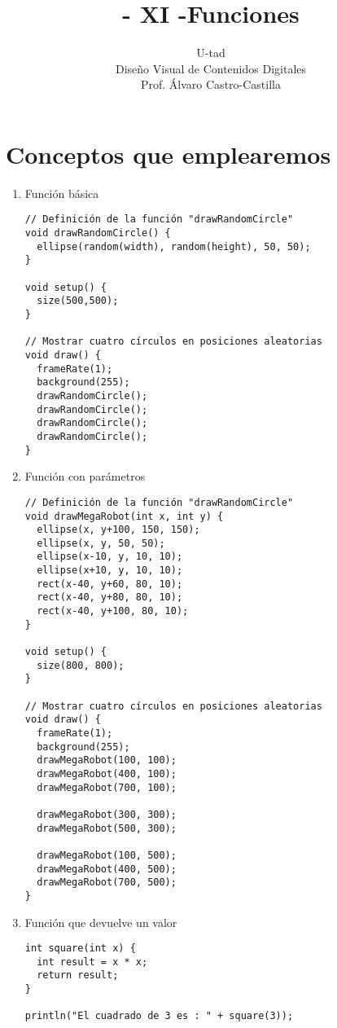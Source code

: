\documentclass[a4paper,oneside]{article}
\title{- XI -\linebreak Funciones}
\author{U-tad\\ Diseño Visual de Contenidos Digitales\\ Prof. Álvaro Castro-Castilla}
\date{}
\begin{document}
\maketitle


\section{Conceptos que emplearemos}
\begin{enumerate}
  \item Función básica

    \begin{verbatim}
// Definición de la función "drawRandomCircle"
void drawRandomCircle() {
  ellipse(random(width), random(height), 50, 50);
}

void setup() {
  size(500,500);
}

// Mostrar cuatro círculos en posiciones aleatorias
void draw() {
  frameRate(1);
  background(255);
  drawRandomCircle();
  drawRandomCircle();
  drawRandomCircle();
  drawRandomCircle();
}
    \end{verbatim}

\newpage
  \item Función con parámetros

    \begin{verbatim}
// Definición de la función "drawRandomCircle"
void drawMegaRobot(int x, int y) {
  ellipse(x, y+100, 150, 150);
  ellipse(x, y, 50, 50);
  ellipse(x-10, y, 10, 10);
  ellipse(x+10, y, 10, 10);
  rect(x-40, y+60, 80, 10);
  rect(x-40, y+80, 80, 10);
  rect(x-40, y+100, 80, 10);
}

void setup() {
  size(800, 800);
}

// Mostrar cuatro círculos en posiciones aleatorias
void draw() {
  frameRate(1);
  background(255);
  drawMegaRobot(100, 100);
  drawMegaRobot(400, 100);
  drawMegaRobot(700, 100);

  drawMegaRobot(300, 300);
  drawMegaRobot(500, 300);

  drawMegaRobot(100, 500);
  drawMegaRobot(400, 500);
  drawMegaRobot(700, 500);
}
    \end{verbatim}

  \item Función que devuelve un valor

    \begin{verbatim}
int square(int x) {
  int result = x * x;
  return result;
}

println("El cuadrado de 3 es : " + square(3));
    \end{verbatim}
      
\end{enumerate}
\end{document}
